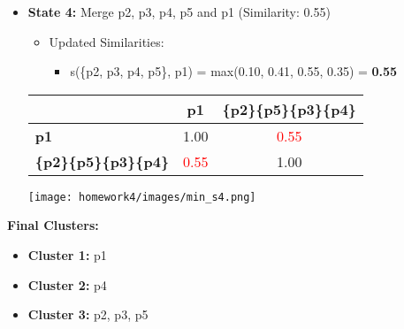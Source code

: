 \documentclass[11pt]{article}
\begin{document}
\begin{enumerate}
\begin{enumerate}
\begin{itemize}
            \item \textbf{State 4:} Merge {p2, p3, p4, p5} and p1 (Similarity: 0.55)

        \begin{itemize}
        \item Updated Similarities:
        \begin{itemize}
            \item s(\{p2, p3, p4, p5\}, p1) = max(0.10, 0.41, 0.55, 0.35) = \textbf{0.55}\\
        \end{itemize}
    \end{itemize}
    
\begin{table}[H]
        \centering
        \begin{minipage}{0.85\textwidth}  %
            \centering
            \begin{minipage}{0.5\textwidth}
                \centering
                \label{tb:exp1}
                \begin{tabular}{ l| c | c}\hline
                           & \textbf{p1} & \textbf{\{p2\}}\textbf{\{p5\}}\textbf{\{p3\}}\textbf{\{p4\}} \\ \hline
                    \bf \hspace{1.5cm} p1                 & 1.00        & \textcolor{red}{0.55} \\
                    \bf \{p2\}\{p5\}\{p3\}\{p4\} & \textcolor{red}{0.55}        & 1.00 \\
                    \hline
                \end{tabular}
            \end{minipage}%
            \hfill
            \begin{minipage}{0.28\textwidth}
                \centering
                \texttt{[image: homework4/images/min\_s4.png]}
                \label{fig:your-image}
            \end{minipage}
        \end{minipage}
    \end{table}
    
    \end{itemize}

    \textbf{Final Clusters:}
    \begin{itemize}
        \item \textbf{Cluster 1:} {p1}
        \item \textbf{Cluster 2:} {p4}
        \item \textbf{Cluster 3:} {p2, p3, p5}\\
    \end{itemize}


\end{enumerate}
\end{enumerate}
\end{document}
